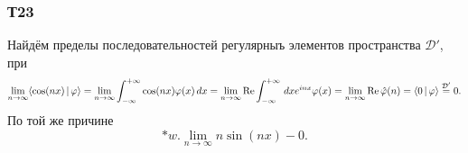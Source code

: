 \subsubsection*{Т23}

Найдём пределы последовательностей регулярныъ элементов пространства $\mathcal D'$, при
\begin{equation*}
    \lim_{n \to \infty} \langle \cos(nx) \,|\, \varphi \rangle  = \lim_{n\to \infty} 
    \int_{-\infty}^{+\infty} \cos(nx) \varphi(x) \, d x = \lim_{n\to \infty} 
    \mathop{\mathrm{Re}}\nolimits \int_{-\infty}^{+\infty} \, d x e^{i nx} \varphi(x) = 
    \lim_{n\to \infty} \mathop{\mathrm{Re}}\nolimits \hat{\varphi}(n) =  \langle 0 \,|\, \varphi \rangle \overset{\mathcal D'}{=} 0.
\end{equation*}
По той же причине 
\begin{equation*}
    * w. \lim_{n\to \infty} n \sin (nx) - 0.
\end{equation*}